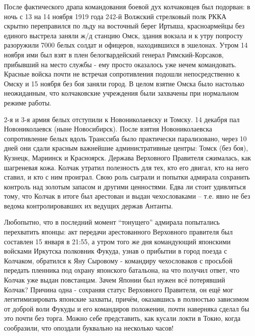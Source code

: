 После фактического драпа командования боевой дух колчаковцев был подорван: в ночь с 13 на 14 ноября 1919 года 242-й Волжский стрелковый полк РККА скрытно переправился по льду на восточный берег Иртыша, красноармейцы без единого выстрела заняли ж/д станцию Омск, здания вокзала и к утру попросту разоружили 7000 белых солдат и офицеров, находившихся в эшелонах. Утром 14 ноября ими был взят в плен белогвардейский генерал Римский-Корсаков, прибывший на место службы - ему просто оказалось уже нечем командовать. Красные войска почти не встречая сопротивления подошли непосредственно к Омску и 15 ноября без боя заняли город. В целом взятие Омска было настолько неожиданным, что колчаковские учреждения были захвачены при нормальном режиме работы.

2-я и 3-я армия белых отступили к Новониколаевску и Томску. 14 декабря пал Новониколаевск (ныне Новосибирск). После взятия Новониколаевска сопротивление белых вдоль Транссиба было практически парализовано, через 10 дней они сдали красным важнейшие административные центры: Томск (без боя), Кузнецк, Мариинск и Красноярск. Держава Верховного Правителя сжималась, как шагреневая кожа. Колчак утратил полезность для тех, кто его двигал, кто на него ставил, и кто с ним проиграл. Свою роль сыграли и попытки адмирала сохранить контроль над золотым запасом и другими ценностями. Едва ли стоит удивляться тому, что Колчак в итоге был арестован и выдан чехословаками – т.е. явно не без ведома контролировавших их ведущих держав Антанты.

Любопытно, что в последний момент “тонущего” адмирала попытались перехватить японцы: акт передачи арестованного Верховного правителя был составлен 15 января в 21:55, а утром того же дня командующий японскими войсками Иркутска полковник Фукуда, узнав о прибытии в город поезда с Колчаком, обратился к Яну Сыровому - командиру чехословаков с просьбой передать пленника под охрану японского батальона, на что получил ответ, что Колчак уже выдан повстанцам. Зачем Японии был нужен всё потерявший Колчак? Причина одна - сохраняя статус Верховного Правителя, он ещё мог легитимизировать японские захваты, причём, оказавшись в полностью зависимом от доброй воли Фукуды и его командиров положении, почти наверняка сделал бы это почти без торга. Можно себе представить, как кусали локти в Токио, когда сообразили, что опоздали буквально на несколько часов!


